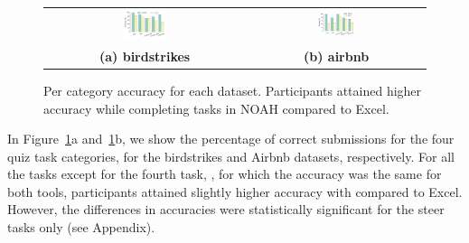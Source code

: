 \begin{figure}[!htbt]
   \centering
\begin{tabular}{c c} %
   \includegraphics[width=0.23\textwidth,trim={18 20 20 20},clip]{images/bird_accC.pdf} &
   \includegraphics[width=0.23\textwidth,trim={18 20 20 10},clip]{images/airbnb_accC.pdf} \\
   \textbf{(a) birdstrikes} & \textbf{(b) airbnb} \\
\end{tabular}
\caption{Per category accuracy for each dataset. Participants attained higher accuracy while completing tasks in NOAH compared to Excel.}
\label{fig:acc}
\end{figure}
In Figure~\ref{fig:acc}a and~\ref{fig:acc}b, 
we show the percentage of correct submissions for the four quiz task categories, 
for the birdstrikes and Airbnb datasets, respectively. 
For all the tasks except for the fourth task, \cmpA, for which the accuracy
was the same for both tools, participants 
attained slightly higher accuracy
with \noah compared to Excel. However, the differences in accuracies were statistically significant 
for the steer tasks only (see Appendix).  

